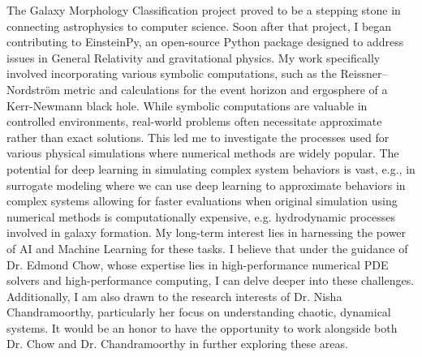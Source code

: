 \documentclass{article}
\begin{document}
\vspace{5pt} 
\hspace{0.25in}The Galaxy Morphology Classification project proved to be a
stepping stone in connecting astrophysics to computer science. Soon after that
project, I began contributing to EinsteinPy, an open-source Python package
designed to address issues in General Relativity and gravitational physics. My
work specifically involved incorporating various symbolic computations, such as
the Reissner–Nordström metric and calculations for the event horizon and
ergosphere of a Kerr-Newmann black hole. While symbolic computations are
valuable in controlled environments, real-world problems often necessitate
approximate rather than exact solutions. This led me to investigate the
processes used for various physical simulations where numerical methods are
widely popular. The potential for deep learning in simulating complex system
behaviors is vast, e.g., in surrogate modeling where we can use deep learning to
approximate behaviors in complex systems allowing for faster evaluations when
original simulation using numerical methods is computationally expensive, e.g.
hydrodynamic processes involved in galaxy formation. My long-term interest lies
in harnessing the power of AI and Machine Learning for these tasks. I believe
that under the guidance of Dr. Edmond Chow, whose expertise lies in
high-performance numerical PDE solvers and high-performance computing, I can
delve deeper into these challenges. Additionally, I am also drawn to the
research interests of Dr. Nisha Chandramoorthy, particularly her focus on
understanding chaotic, dynamical systems. It would be an honor to have the
opportunity to work alongside both Dr. Chow and Dr. Chandramoorthy in further
exploring these areas.
\end{document}
